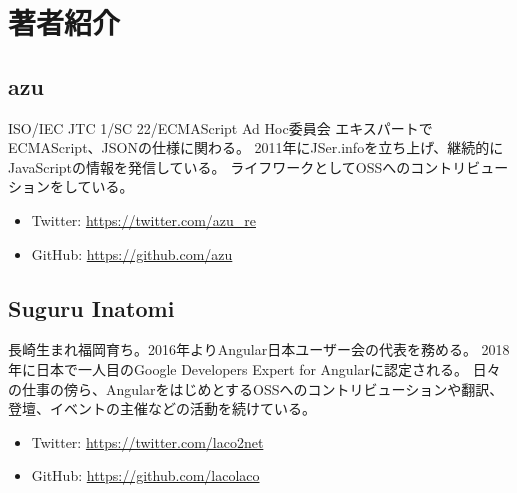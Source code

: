 \hypertarget{authors}{%
\chapter*{著者紹介}\label{authors}}
\thispagestyle{frontheadings}

\hypertarget{author-azu}{%
\section*{azu}\label{author-azu}}

ISO/IEC JTC 1/SC 22/ECMAScript Ad Hoc委員会
エキスパートでECMAScript、JSONの仕様に関わる。
2011年にJSer.infoを立ち上げ、継続的にJavaScriptの情報を発信している。
ライフワークとしてOSSへのコントリビューションをしている。

\begin{itemize}
\item
  Twitter: \url{https://twitter.com/azu\_re}
\item
  GitHub: \url{https://github.com/azu}
\end{itemize}

\hypertarget{author-suguru-inatomi}{%
\section*{Suguru Inatomi}\label{author-suguru-inatomi}}

長崎生まれ福岡育ち。2016年よりAngular日本ユーザー会の代表を務める。
2018年に日本で一人目のGoogle Developers Expert for Angularに認定される。
日々の仕事の傍ら、AngularをはじめとするOSSへのコントリビューションや翻訳、登壇、イベントの主催などの活動を続けている。

\begin{itemize}
\item
  Twitter: \url{https://twitter.com/laco2net}
\item
  GitHub: \url{https://github.com/lacolaco}
\end{itemize}
